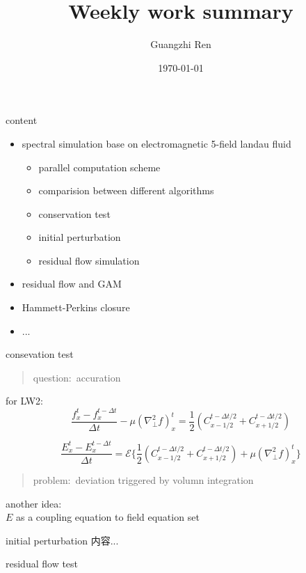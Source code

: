 \documentclass{beamer}
\title{Weekly work summary}
\author{Guangzhi Ren}
\institute {}
\date{\today}
\begin{document}
	
\begin{frame}
	\titlepage   
\end{frame}


\begin{frame}{content}
\begin{itemize}
	\item spectral simulation base on electromagnetic 5-field landau fluid
		\begin{itemize}
			\item parallel computation scheme
			\item comparision between different algorithms
			\item conservation test
			\item initial perturbation
			\item residual flow simulation
		\end{itemize}
	\item residual flow and GAM
	\item Hammett-Perkins closure 
	\item ...	
\end{itemize}
\end{frame}



\begin{frame}{consevation test}
	\begin{quotation}
		{\color{magenta} question:\ accuration}
	\end{quotation}
	for LW2: 
	\begin{equation}
		\frac{f_x^t-f_x^{t-\Delta{t}}}{\Delta{t}}-\mu(\nabla_\perp^2{f})_x^{t}
		= \frac{1}{2}( C_{x-1/2}^{t-\Delta{t}/2}+C_{x+1/2}^{t-\Delta{t}/2} )
	\end{equation}
	
	\begin{equation}
		\frac{E_x^t-E_x^{t-\Delta{t}}}{\Delta{t}}
		= \mathcal{E}\{ \frac{1}{2}( C_{x-1/2}^{t-\Delta{t}/2}+C_{x+1/2}^{t-\Delta{t}/2} ) +\mu(\nabla_\perp^2{f})_x^{t} \}
	\end{equation}
	
	\begin{quotation}
		{\color{blue} problem:\ deviation triggered by volumn integration}
	\end{quotation}
	another idea:	\\
	\qquad $E$ as a coupling equation to field equation set
\end{frame}


\begin{frame}{initial perturbation}
	内容...
\end{frame}


\begin{frame}{residual flow test}
	
\end{frame}
\end{document}
